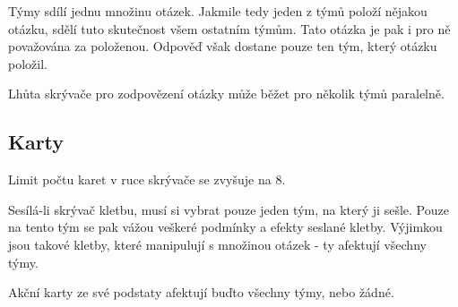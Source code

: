 \documentclass{book}
\begin{document}
Týmy sdílí jednu množinu otázek. Jakmile tedy jeden z týmů položí nějakou otázku, sdělí tuto skutečnost všem ostatním týmům. Tato otázka je pak i pro ně považována za položenou. Odpověď však dostane pouze ten tým, který otázku položil.

Lhůta skrývače pro zodpovězení otázky může běžet pro několik týmů paralelně.

\subsection{Karty}

Limit počtu karet v ruce skrývače se zvyšuje na 8.

Sesílá-li skrývač kletbu, musí si vybrat pouze jeden tým, na který ji sešle. Pouze na tento tým se pak vážou veškeré podmínky a efekty seslané kletby. Výjimkou jsou takové kletby, které manipulují s množinou otázek - ty afektují všechny týmy.

Akční karty ze své podstaty afektují buďto všechny týmy, nebo žádné.
\end{document}
